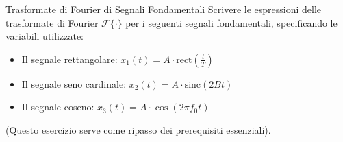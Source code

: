 
\begin{esercizio}{Trasformate di Fourier di Segnali Fondamentali}
    Scrivere le espressioni delle trasformate di Fourier $\mathcal{F}\{ \cdot \}$ per i seguenti segnali fondamentali, specificando le variabili utilizzate:

    \begin{itemize}
        \item Il segnale rettangolare: $x_1(t) = A \cdot \text{rect}\left(\frac{t}{T}\right)$
        \item Il segnale seno cardinale: $x_2(t) = A \cdot \text{sinc}(2Bt)$
        \item Il segnale coseno: $x_3(t) = A \cdot \cos(2\pi f_0 t)$
    \end{itemize}
    
    (Questo esercizio serve come ripasso dei prerequisiti essenziali).
\end{esercizio}